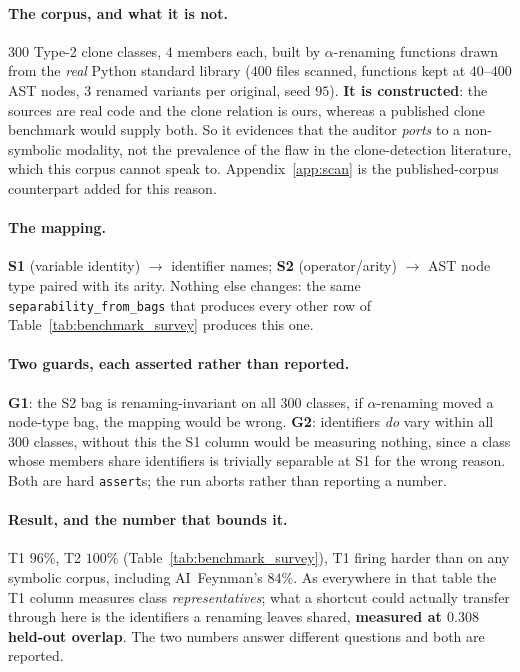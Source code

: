 \paragraph{The corpus, and what it is not.} $300$ Type-2 clone classes, $4$ members each, built by $\alpha$-renaming functions drawn from the \emph{real} Python standard library ($400$ files scanned, functions kept at $40$--$400$ AST nodes, $3$ renamed variants per original, seed $95$). \textbf{It is constructed}: the sources are real code and the clone relation is ours, whereas a published clone benchmark would supply both. So it evidences that the auditor \emph{ports} to a non-symbolic modality, not the prevalence of the flaw in the clone-detection literature, which this corpus cannot speak to. Appendix~\ref{app:scan} is the published-corpus counterpart added for this reason.

\paragraph{The mapping.} \textbf{S1} (variable identity) $\to$ identifier names; \textbf{S2} (operator/arity) $\to$ AST node type paired with its arity. Nothing else changes: the same \texttt{separability\_from\_bags} that produces every other row of Table~\ref{tab:benchmark_survey} produces this one.

\paragraph{Two guards, each asserted rather than reported.} \textbf{G1}: the S2 bag is renaming-invariant on all $300$ classes, if $\alpha$-renaming moved a node-type bag, the mapping would be wrong. \textbf{G2}: identifiers \emph{do} vary within all $300$ classes, without this the S1 column would be measuring nothing, since a class whose members share identifiers is trivially separable at S1 for the wrong reason. Both are hard \texttt{assert}s; the run aborts rather than reporting a number.

\paragraph{Result, and the number that bounds it.} T1 $96\%$, T2 $100\%$ (Table~\ref{tab:benchmark_survey}), T1 firing harder than on any symbolic corpus, including AI~Feynman's $84\%$. As everywhere in that table the T1 column measures class \emph{representatives}; what a shortcut could actually transfer through here is the identifiers a renaming leaves shared, \textbf{measured at $0.308$ held-out overlap}. The two numbers answer different questions and both are reported.

